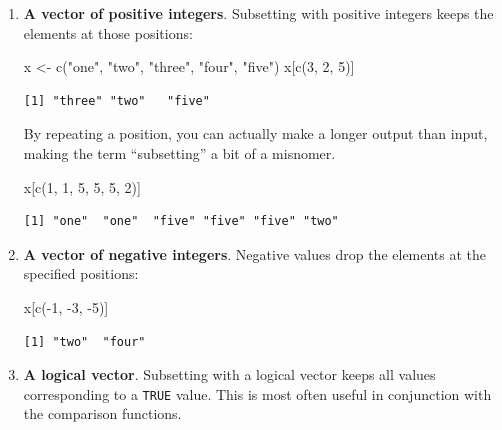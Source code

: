 \documentclass[
  letterpaper,
  DIV=11,
  numbers=noendperiod]{scrreprt}
\newenvironment{Shaded}{\begin{snugshade}}{\end{snugshade}}
\newcommand{\DecValTok}[1]{\textcolor[rgb]{0.68,0.00,0.00}{#1}}
\newcommand{\FunctionTok}[1]{\textcolor[rgb]{0.28,0.35,0.67}{#1}}
\newcommand{\NormalTok}[1]{\textcolor[rgb]{0.00,0.23,0.31}{#1}}
\newcommand{\OtherTok}[1]{\textcolor[rgb]{0.00,0.23,0.31}{#1}}
\newcommand{\SpecialCharTok}[1]{\textcolor[rgb]{0.37,0.37,0.37}{#1}}
\newcommand{\StringTok}[1]{\textcolor[rgb]{0.13,0.47,0.30}{#1}}
\begin{document}
\begin{enumerate}
\def\labelenumi{\arabic{enumi}.}
\item
  \textbf{A vector of positive integers}. Subsetting with positive
  integers keeps the elements at those positions:

\begin{Shaded}
\begin{Highlighting}[]
\NormalTok{x }\OtherTok{\textless{}{-}} \FunctionTok{c}\NormalTok{(}\StringTok{"one"}\NormalTok{, }\StringTok{"two"}\NormalTok{, }\StringTok{"three"}\NormalTok{, }\StringTok{"four"}\NormalTok{, }\StringTok{"five"}\NormalTok{)}
\NormalTok{x[}\FunctionTok{c}\NormalTok{(}\DecValTok{3}\NormalTok{, }\DecValTok{2}\NormalTok{, }\DecValTok{5}\NormalTok{)]}
\end{Highlighting}
\end{Shaded}

\begin{verbatim}
[1] "three" "two"   "five" 
\end{verbatim}

  By repeating a position, you can actually make a longer output than
  input, making the term ``subsetting'' a bit of a misnomer.

\begin{Shaded}
\begin{Highlighting}[]
\NormalTok{x[}\FunctionTok{c}\NormalTok{(}\DecValTok{1}\NormalTok{, }\DecValTok{1}\NormalTok{, }\DecValTok{5}\NormalTok{, }\DecValTok{5}\NormalTok{, }\DecValTok{5}\NormalTok{, }\DecValTok{2}\NormalTok{)]}
\end{Highlighting}
\end{Shaded}

\begin{verbatim}
[1] "one"  "one"  "five" "five" "five" "two" 
\end{verbatim}
\item
  \textbf{A vector of negative integers}. Negative values drop the
  elements at the specified positions:

\begin{Shaded}
\begin{Highlighting}[]
\NormalTok{x[}\FunctionTok{c}\NormalTok{(}\SpecialCharTok{{-}}\DecValTok{1}\NormalTok{, }\SpecialCharTok{{-}}\DecValTok{3}\NormalTok{, }\SpecialCharTok{{-}}\DecValTok{5}\NormalTok{)]}
\end{Highlighting}
\end{Shaded}

\begin{verbatim}
[1] "two"  "four"
\end{verbatim}
\item
  \textbf{A logical vector}. Subsetting with a logical vector keeps all
  values corresponding to a \texttt{TRUE} value. This is most often
  useful in conjunction with the comparison functions.


\end{enumerate}
\end{document}
